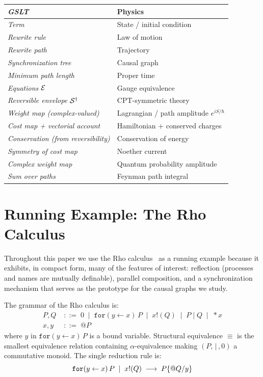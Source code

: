 \begin{center}
\renewcommand{\arraystretch}{1.4}
\begin{tabular}{>{\itshape}p{4.8cm} p{6.8cm}}
\toprule
\normalfont\textbf{GSLT} & \textbf{Physics} \\
\midrule
Term                          & State / initial condition \\
Rewrite rule                  & Law of motion \\
Rewrite path                  & Trajectory \\
Synchronization tree          & Causal graph \\
Minimum path length           & Proper time \\
Equations $\mathcal{E}$              & Gauge equivalence \\
Reversible envelope $\mathcal{S}^\dagger$ & CPT-symmetric theory \\
Weight map (complex-valued)   & Lagrangian / path amplitude $e^{iS/\hbar}$ \\
Cost map + vectorial account  & Hamiltonian + conserved charges \\
Conservation (from reversibility) & Conservation of energy \\
Symmetry of cost map          & Noether current \\
Complex weight map            & Quantum probability amplitude \\
Sum over paths                & Feynman path integral \\
\bottomrule
\end{tabular}
\end{center}

\section{Running Example: The Rho Calculus}

Throughout this paper we use the Rho calculus~\cite{meredith2005rho} as a
running example because it exhibits, in compact form, many of the features of
interest: reflection (processes and names are mutually definable), parallel
composition, and a synchronization mechanism that serves as the prototype for
the causal graphs we study.

The grammar of the Rho calculus is:
\begin{align}
  P, Q &\;::=\; 0 \;\mid\; \mathtt{for}(y \leftarrow x)\,P \;\mid\;
               x!(Q) \;\mid\; P \mid Q \;\mid\; {*}x \\
  x, y &\;::=\; @P
\end{align}
where $y$ in $\mathtt{for}(y \leftarrow x)\,P$ is a bound variable.
Structural equivalence $\equiv$ is the smallest equivalence relation containing
$\alpha$-equivalence making $(P,\,|\,,0)$ a commutative monoid.
The single reduction rule is:
\[
  \mathtt{for}(y \leftarrow x)\,P \;\mid\; x!(Q)
  \;\longrightarrow\;
  P\{@Q / y\}
\]

